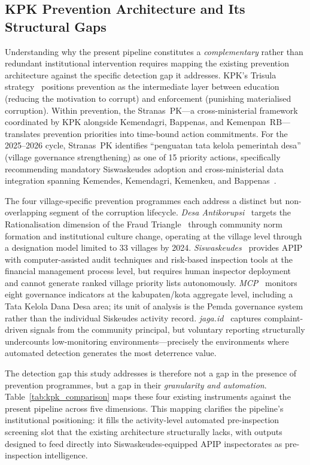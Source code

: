 \documentclass[3p,times,procedia]{elsarticle}
\begin{document}
\subsection{KPK Prevention Architecture and Its Structural Gaps}
\label{sec:kpk_prevention}

Understanding why the present pipeline constitutes a \textit{complementary} rather than redundant institutional intervention requires mapping the existing prevention architecture against the specific detection gap it addresses. KPK's Trisula strategy~\cite{ref4} positions prevention as the intermediate layer between education (reducing the motivation to corrupt) and enforcement (punishing materialised corruption). Within prevention, the Stranas~PK---a cross-ministerial framework coordinated by KPK alongside Kemendagri, Bappenas, and Kemenpan~RB---translates prevention priorities into time-bound action commitments. For the 2025--2026 cycle, Stranas~PK identifies “penguatan tata kelola pemerintah desa” (village governance strengthening) as one of 15 priority actions, specifically recommending mandatory Siswaskeudes adoption and cross-ministerial data integration spanning Kemendes, Kemendagri, Kemenkeu, and Bappenas~\cite{ref7}.

The four village-specific prevention programmes each address a distinct but non-overlapping segment of the corruption lifecycle. \textit{Desa Antikorupsi}~\cite{ref5} targets the Rationalisation dimension of the Fraud Triangle~\cite{ref21} through community norm formation and institutional culture change, operating at the village level through a designation model limited to 33 villages by 2024. \textit{Siswaskeudes}~\cite{ref6} provides APIP with computer-assisted audit techniques and risk-based inspection tools at the financial management process level, but requires human inspector deployment and cannot generate ranked village priority lists autonomously. \textit{MCP}~\cite{ref8} monitors eight governance indicators at the kabupaten/kota aggregate level, including a Tata Kelola Dana Desa area; its unit of analysis is the Pemda governance system rather than the individual Siskeudes activity record. \textit{jaga.id}~\cite{ref9} captures complaint-driven signals from the community principal, but voluntary reporting structurally undercounts low-monitoring environments---precisely the environments where automated detection generates the most deterrence value.

The detection gap this study addresses is therefore not a gap in the presence of prevention programmes, but a gap in their \textit{granularity and automation}. Table~\ref{tab:kpk_comparison} maps these four existing instruments against the present pipeline across five dimensions. This mapping clarifies the pipeline's institutional positioning: it fills the activity-level automated pre-inspection screening slot that the existing architecture structurally lacks, with outputs designed to feed directly into Siswaskeudes-equipped APIP inspectorates as pre-inspection intelligence.
\end{document}
